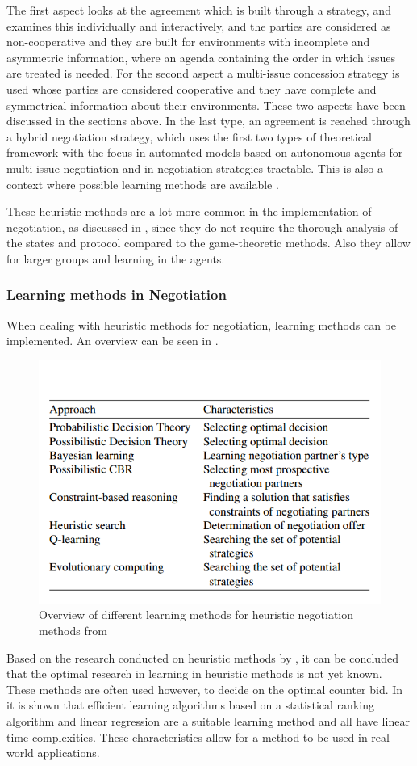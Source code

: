 The first aspect looks at the agreement which is built through a strategy, and examines this individually and interactively, and the parties are considered as non-cooperative and they are built for environments with incomplete and asymmetric information, where an agenda containing the order in which issues are treated is needed. For the second aspect a multi-issue concession strategy is used whose parties are considered cooperative and they have complete and symmetrical information about their environments. These two aspects have been discussed in the sections above. In the last type, an agreement is reached through a hybrid negotiation strategy, which uses the first two types of theoretical framework with the focus in automated models based on autonomous agents for multi-issue negotiation and in negotiation strategies tractable. This is also a context where possible learning methods are available \citep{schramm2013bilateral}. 
	
These heuristic methods are a lot more common in the implementation of negotiation, as discussed in \citep{leitao2013past, monostori2006agent}, since they do not require the thorough analysis of the states and protocol compared to the game-theoretic methods. Also they allow for larger groups and learning in the agents.
	
\subsubsection{Learning methods in Negotiation}
When dealing with heuristic methods for negotiation, learning methods can be implemented. An overview can be seen in . 
\begin{figure}
\centering
\includegraphics[width=0.7\linewidth]{img/negotiation_learning}
\caption{Overview of different learning methods for heuristic negotiation methods from \citet{beheshti2014homan}}
\label{fig:negotiationlearning}
\end{figure}
Based on the research conducted on heuristic methods by \citet{jennings2001automated}, it can be concluded that the optimal research in learning in heuristic methods is not yet known. These methods are often used however, to decide on the optimal counter bid. In \citep{beheshti2014homan} it is shown that efficient learning algorithms based on a statistical ranking algorithm and linear regression are a suitable learning method and all have linear time complexities. These characteristics allow for a method to be used in real-world applications. 
